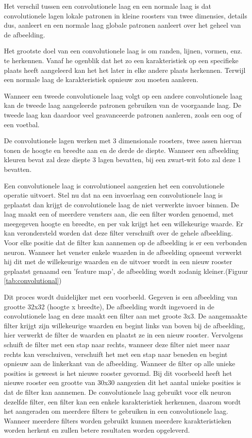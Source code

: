 Het verschil tussen een convolutionele laag en een normale laag is dat convolutionele lagen 
lokale patronen in kleine roosters van twee dimensies, details dus, aanleert en een normale laag globale patronen aanleert over het geheel van de afbeelding.

Het grootste doel van een convolutionele laag is om randen, lijnen, vormen, enz. te herkennen.
Vanaf he ogenblik dat het zo een karakteristiek op een specifieke plaats heeft aangeleerd kan het het later in elke andere plaats herkennen. Terwijl een normale laag de karakteristiek opnieuw zou moeten aanleren.

Wanneer een tweede convolutionele laag volgt op een andere convolutionele laag kan de tweede laag aangeleerde patronen gebruiken van de voorgaande laag.
De tweede laag kan daardoor veel geavanceerde patronen aanleren, zoals een oog of een voetbal.

De convolutionele lagen werken met 3 dimensionale roosters, twee assen hiervan tonen de hoogte en breedte aan en de derde de diepte. Wanneer een afbeelding kleuren bevat zal deze diepte 3 lagen bevatten, bij een zwart-wit foto zal deze 1 bevatten.

Een convolutionele laag is convolutioneel aangezien het een convolutionele operatie uitvoert.
Stel nu dat na een invoerlaag een convolutionele laag is geplaatst
dan krijgt de convolutionele laag de niet verwerkte invoer binnen.
De laag maakt een of meerdere vensters aan, die een filter worden genoemd, met meegegeven hoogte en breedte, en per vak krijgt het een willekeurige waarde. Er kan verondersteld worden dat deze filter verschuift over de gehele afbeelding. Voor elke positie dat de filter kan aannemen op de afbeelding is er een verbonden neuron.
Wanneer het venster enkele waarden in de afbeelding opneemt verwerkt hij dit met de willekeurige waarden en de uitvoer wordt in een nieuw rooster geplaatst genaamd een 'feature map', de afbeelding wordt zodanig kleiner.(Figuur \ref{tab:convolutional})

Dit proces wordt duidelijker met een voorbeeld.
Gegeven is een afbeelding van grootte 32x32 (hoogte x breedte),
De afbeelding wordt ingevoerd in de convolutionele laag en deze maakt een filter aan met groote 3x3.
De aangemaakte filter krijgt zijn willekeurige waarden en begint links van boven bij de afbeelding, hier verwerkt de filter de waarden en plaatst ze in een nieuw rooster. 
Vervolgens schuift de filter met een stap naar rechts, wanneer deze filter niet meer naar rechts kan verschuiven, verschuift het met een stap naar beneden en begint opnieuw aan de linkerkant van de afbeelding.
Wanneer de filter op alle unieke posities is geweest is het nieuwe rooster gevormd. Bij dit voorbeeld heeft het nieuwe rooster een grootte van 30x30 aangezien dit het aantal unieke posities is dat de filter kan aannemen.
De convolutionele laag gebruikt voor elk neuron dezelfde filter, een filter kan een enkele karakteristiek herkennen, daarom wordt het aangeraden om meerdere filters te gebruiken in een convolutionele laag.
Wanneer meerdere filters worden gebruikt kunnen meerdere karakteristieken worden herkent en zullen betere resultaten worden opgeleverd.



